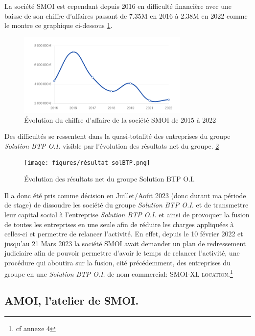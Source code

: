 La société SMOI est cependant depuis 2016 en difficulté financière avec une baisse de son chiffre d'affaires passant de 7.35M en 2016 à 2.38M en 2022 comme le montre ce graphique ci-dessous \ref{fig:CA_SMOI}.
\begin{figure}[h!]
    \centering
    \includegraphics[width=0.75\textwidth]{figures/CA_SMOI.png}
    \caption{Évolution du chiffre d'affaire de la société SMOI de 2015 à 2022}
    \label{fig:CA_SMOI}
\end{figure}\newpage
Des difficultés se ressentent dans la quasi-totalité des entreprises du groupe \textit{Solution BTP O.I.} visible par l'évolution des résultats net du groupe. \ref{fig:résultat_solBTP}
\begin{figure}[h!]
    \centering
    \texttt{[image: figures/résultat\_solBTP.png]}
    \caption{Évolution des résultats net du groupe Solution BTP O.I.}
    \label{fig:résultat_solBTP}
\end{figure}\newline
Il a donc été pris comme décision en Juillet/Août 2023 (donc durant ma période de stage) de dissoudre les société du groupe \textit{Solution BTP O.I.} et de transmettre leur capital social à l'entreprise \textit{Solution BTP O.I.} et ainsi de provoquer la fusion de toutes les entreprises en une seule afin de réduire les charges appliquées à celles-ci et permettre de relancer l'activité. En effet, depuis le 10 février 2022 et jusqu'au 21 Mars 2023 la société SMOI avait demander un plan de redressement judiciaire afin de pouvoir permettre d'avoir le temps de relancer l'activité, une procédure qui aboutira sur la fusion, cité précédemment, des entreprises du groupe en une \textit{Solution BTP O.I.} de nom commercial: \textsc{SMOI-XL location}.\footnote{cf annexe 4}\newline



\subsection{AMOI, l'atelier de SMOI.}

